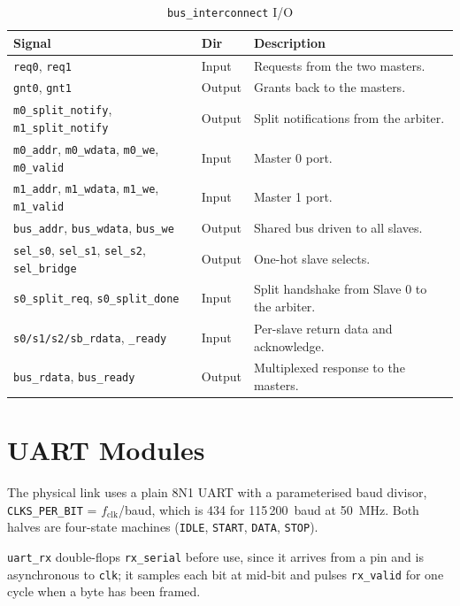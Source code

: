 \documentclass[11pt,a4paper]{article}
\newcommand{\sig}[1]{\texttt{#1}}
\begin{document}
\begin{table}[htbp]
\centering
\caption{\sig{bus\_interconnect} I/O}
\label{tab:io_ic}
\small
\begin{tabularx}{\textwidth}{llX}
\toprule
\textbf{Signal} & \textbf{Dir} & \textbf{Description} \\
\midrule
\sig{req0}, \sig{req1}                  & Input  & Requests from the two masters. \\
\sig{gnt0}, \sig{gnt1}                  & Output & Grants back to the masters. \\
\sig{m0\_split\_notify}, \sig{m1\_split\_notify} & Output & Split notifications from the arbiter. \\
\sig{m0\_addr}, \sig{m0\_wdata}, \sig{m0\_we}, \sig{m0\_valid} & Input & Master 0 port. \\
\sig{m1\_addr}, \sig{m1\_wdata}, \sig{m1\_we}, \sig{m1\_valid} & Input & Master 1 port. \\
\sig{bus\_addr}, \sig{bus\_wdata}, \sig{bus\_we} & Output & Shared bus driven to all slaves. \\
\sig{sel\_s0}, \sig{sel\_s1}, \sig{sel\_s2}, \sig{sel\_bridge} & Output & One-hot slave selects. \\
\sig{s0\_split\_req}, \sig{s0\_split\_done} & Input & Split handshake from Slave 0 to the arbiter. \\
\sig{s0/s1/s2/sb\_rdata}, \sig{\_ready} & Input  & Per-slave return data and acknowledge. \\
\sig{bus\_rdata}, \sig{bus\_ready}      & Output & Multiplexed response to the masters. \\
\bottomrule
\end{tabularx}
\end{table}

\section{UART Modules}

The physical link uses a plain 8N1 UART with a parameterised baud divisor,
\sig{CLKS\_PER\_BIT} = $f_\mathrm{clk}$/baud, which is 434 for 115\,200~baud at
50~MHz. Both halves are four-state machines (\sig{IDLE}, \sig{START},
\sig{DATA}, \sig{STOP}).

\sig{uart\_rx} double-flops \sig{rx\_serial} before use, since it arrives from a
pin and is asynchronous to \sig{clk}; it samples each bit at mid-bit and pulses
\sig{rx\_valid} for one cycle when a byte has been framed.
\end{document}

